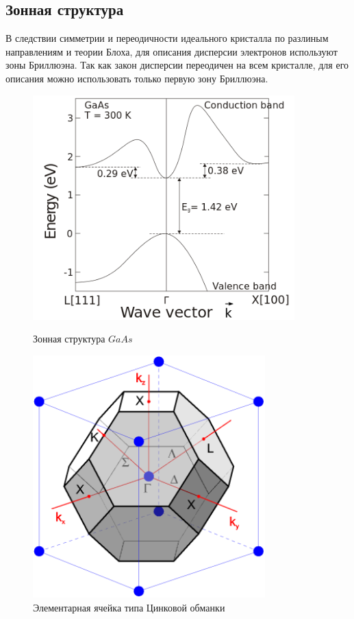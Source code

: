 \subsection{Зонная структура}
В следствии симметрии и переодичности идеального кристалла по разлиным направлениям и теории Блоха, для описания дисперсии электронов используют зоны Бриллюэна. Так как закон дисперсии переодичен на всем кристалле, для его описания можно использовать только первую зону Бриллюэна. 
\begin{figure}[h]
	\centering
    \begin{minipage}[b]{0.5\textwidth}
	    \includegraphics[width=0.9\textwidth]{assets/GaAs_E}
	    \caption{Зонная структура $GaAs$}
	\end{minipage}
	\hfill
	\begin{minipage}[b]{0.45\textwidth}
		\includegraphics[width=0.8\textwidth]{assets/ZnLaer}
	    \caption{Элементарная ячейка типа Цинковой обманки}
	\end{minipage}
\end{figure}


